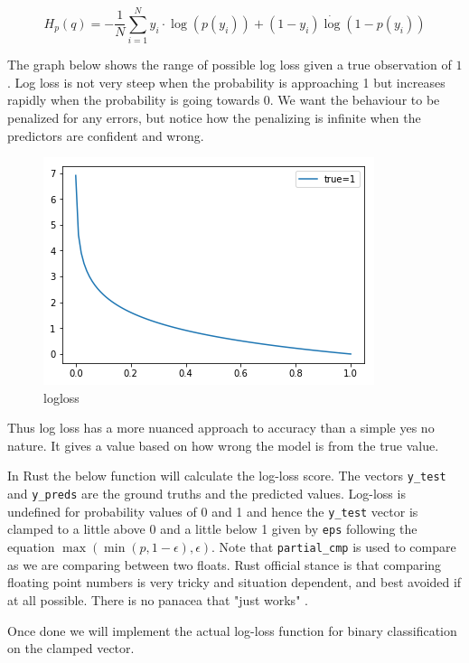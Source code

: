 \documentclass{book}
\begin{document}
\begin{equation}
	H_p(q) = - \frac{1}{N}\sum_{i=1}^{N}y_i \cdot \log(p(y_i)) + (1-y_i) \dot \log(1-p(y_i))
\end{equation}

The graph below shows the range of possible log loss given a true observation of $1$. Log loss is not very steep when the probability is approaching 1 but increases rapidly when the probability is going towards 0. We want the behaviour to be penalized for any errors, but notice how the penalizing is infinite when the predictors are confident and wrong.

\begin{figure}[htpb]
	\centering
	\includegraphics[width=0.8\linewidth]{logloss.png}
	\caption{logloss}
	\label{fig:logloss}
\end{figure}

Thus log loss has a more nuanced approach to accuracy than a simple yes no nature. It gives a value based on how wrong the model is from the true value.

In Rust the below function will calculate the log-loss score. The vectors \lstinline{y_test} and \lstinline{y_preds} are the ground truths and the predicted values. Log-loss is undefined for probability values of 0 and 1 and hence the \lstinline{y_test} vector is clamped to a little above 0 and a little below 1 given by \lstinline{eps} following the equation $\max(\min(p, 1 - \epsilon), \epsilon)$. Note that \lstinline{partial_cmp} is used to compare as we are comparing between two floats. Rust official stance is that comparing floating point numbers is very tricky and situation dependent, and best avoided if at all possible. There is no panacea that "just works"\cite{WEBSITE:16} .

Once done we will implement the actual log-loss function for binary classification on the clamped vector.
\end{document}
